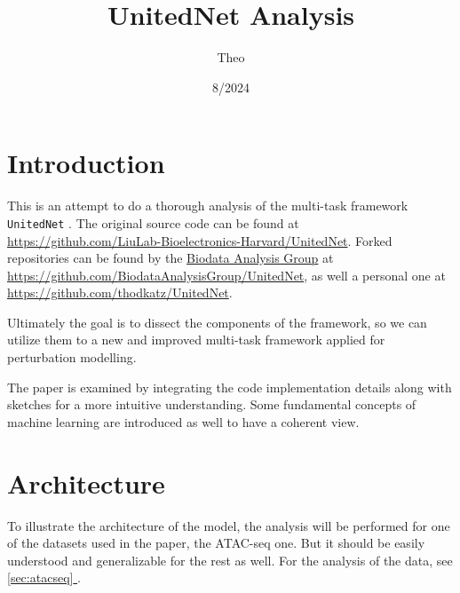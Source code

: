 \documentclass[12pt, a4paper]{article}
\newcommand*{\fullref}[1]{\hyperref[{#1}]{\ref*{#1} \nameref*{#1}}}
\begin{document}
\title{\vspace{-1cm}
UnitedNet Analysis}

\author{Theo}


\date{8/2024}


\sloppy
\maketitle

{
\hypersetup{linkcolor=black}
\tableofcontents
}

\clearpage

\section{Introduction}
\label{sec:introduction}

This is an attempt to do a thorough analysis of the multi-task framework \verb|UnitedNet| \cite{tangExplainableMultitaskLearning2023}. The original source code can be found at \url{https://github.com/LiuLab-Bioelectronics-Harvard/UnitedNet}. Forked repositories can be found by the \href{https://biodataanalysisgroup.github.io/}{Biodata Analysis Group} at \url{https://github.com/BiodataAnalysisGroup/UnitedNet},  as well a personal one at \url{https://github.com/thodkatz/UnitedNet}.

Ultimately the goal is to dissect the components of the framework, so we can utilize them to a new and improved multi-task framework applied for perturbation modelling.

The paper is examined by integrating the code implementation details along with sketches for a more intuitive understanding. Some fundamental concepts of machine learning are introduced as well to have a coherent view.

\clearpage

\section{Architecture}

To illustrate the architecture of the model, the analysis will be performed for one of the datasets used in the paper, the ATAC-seq one. But it should be easily understood and generalizable for the rest as well. For the analysis of the data, see \fullref{sec:atacseq}.
\end{document}
